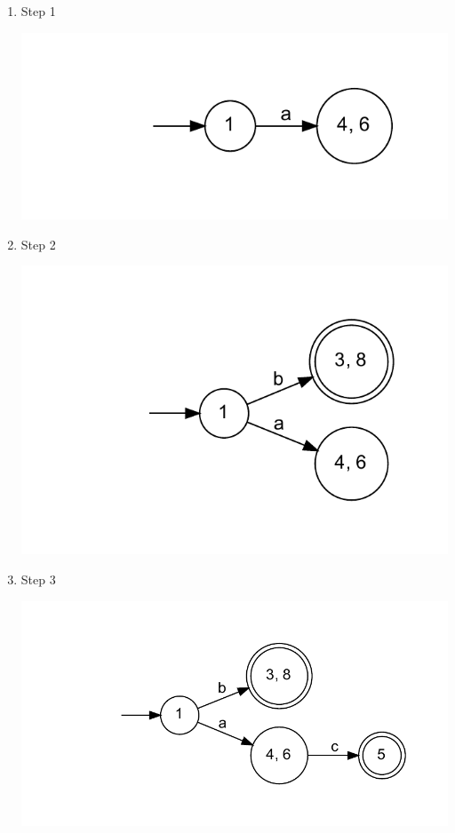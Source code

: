 \documentclass{article}
\begin{document}
\begin{enumerate}
\item Step 1
\begin{center}
\includegraphics[width=\textwidth]{step8.dot.pdf}
\end{center}
\item Step 2
\begin{center}
\includegraphics[width=\textwidth]{step9.dot.pdf}
\end{center}
\item Step 3
\begin{center}
\includegraphics[width=\textwidth]{step10.dot.pdf}

\end{center}
\end{enumerate}
\end{document}
